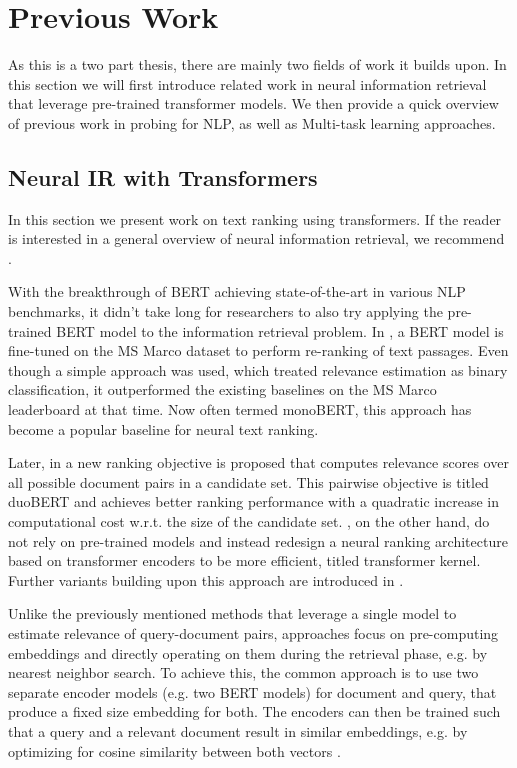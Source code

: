 \chapter{Previous Work}
\label{chap:prev}
As this is a two part thesis, there are mainly two fields of work it builds upon. In this section we will first introduce related work in neural information retrieval that leverage pre-trained transformer models. We then provide a quick overview of previous work in probing for NLP, as well as Multi-task learning approaches.

\section{Neural IR with Transformers}
In this section we present work on text ranking using transformers. If the reader is interested in a general overview of neural information retrieval, we recommend \cite{mitra2018an, Onal2017NeuralIR, Guo2020ADL}.

With the breakthrough of BERT \cite{devlin-etal-2019-bert} achieving state-of-the-art in various NLP benchmarks, it didn't take long for researchers to also try applying the pre-trained BERT model to the information retrieval problem. In \cite{Nogueira2019PassageRW}, a BERT model is fine-tuned on the MS Marco dataset \cite{DBLP:journals/corr/NguyenRSGTMD16} to perform re-ranking of text passages. Even though a simple approach was used, which treated relevance estimation as binary classification, it outperformed the existing baselines on the MS Marco leaderboard at that time. Now often termed monoBERT, this approach has become a popular baseline for neural text ranking.

Later, in \cite{Nogueira2019MultiStageDR} a new ranking objective is proposed that computes relevance scores over all possible document pairs in a candidate set. This pairwise objective is titled duoBERT and achieves better ranking performance with a quadratic increase in computational cost w.r.t. the size of the candidate set. \cite{DBLP:journals/corr/abs-1912-01385}, on the other hand, do not rely on pre-trained models and instead redesign a neural ranking architecture based on transformer encoders to be more efficient, titled transformer kernel. Further variants building upon this approach are introduced in \cite{Hofsttter2020LocalSO, 10.1145/3404835.3463049}.

Unlike the previously mentioned methods that leverage a single model to estimate relevance of query-document pairs,  approaches focus on pre-computing embeddings and directly operating on them during the retrieval phase, e.g. by nearest neighbor search. To achieve this, the common approach is to use two separate encoder models (e.g. two BERT models) for document and query, that produce a fixed size embedding for both. The encoders can then be trained such that a query and a relevant document result in similar embeddings, e.g. by optimizing for cosine similarity between both vectors \cite{Humeau2020Poly-encoders, 10.1145/3397271.3401075, DBLP:journals/corr/abs-1908-10084}.


